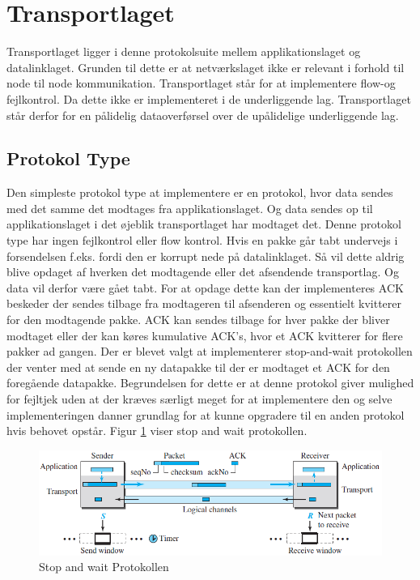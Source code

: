 \section{Transportlaget}
Transportlaget ligger i denne protokolsuite mellem applikationslaget og datalinklaget. Grunden til dette er at netværkslaget ikke er relevant i forhold til node til node kommunikation. Transportlaget står for at implementere flow-og fejlkontrol. Da dette ikke er implementeret i de underliggende lag. Transportlaget står derfor for en pålidelig dataoverførsel over de upålidelige underliggende lag.

\subsection{Protokol Type}
Den simpleste protokol type at implementere er en protokol, hvor data sendes med det samme det modtages fra applikationslaget. Og data sendes op til applikationslaget i det øjeblik transportlaget har modtaget det. Denne protokol type har ingen fejlkontrol eller flow kontrol. Hvis en pakke går tabt undervejs i forsendelsen f.eks. fordi den er korrupt nede på datalinklaget. Så vil dette aldrig blive opdaget af hverken det modtagende eller det afsendende transportlag. Og data vil derfor være gået tabt. For at opdage dette kan der implementeres ACK beskeder der sendes tilbage fra modtageren til afsenderen og essentielt kvitterer for den modtagende pakke. ACK kan sendes tilbage for hver pakke der bliver modtaget eller der kan køres kumulative ACK's, hvor et ACK kvitterer for flere pakker ad gangen. Der er blevet valgt at implementerer stop-and-wait protokollen der venter med at sende en ny datapakke til der er modtaget et ACK for den foregående datapakke. Begrundelsen for dette er  at denne protokol giver mulighed for fejltjek uden at der kræves særligt meget for at implementere den og selve implementeringen danner grundlag for at kunne opgradere til en anden protokol hvis behovet opstår. Figur \ref{StopAndWait} viser stop and wait protokollen.
\begin{figure}[h]
\centering
\includegraphics[scale=0.75]{Billeder/StopAndWait.png}
\caption{Stop and wait Protokollen
\label{StopAndWait}}
\end{figure}

